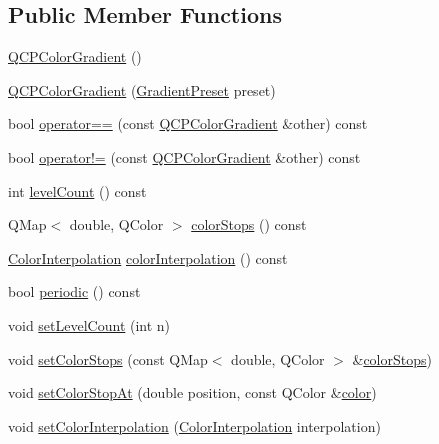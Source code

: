 \subsection*{Public Member Functions}
\begin{DoxyCompactItemize}
\item 
\hyperlink{class_q_c_p_color_gradient_a96bcc490ff9dc32b22941ce00800bce0}{Q\+C\+P\+Color\+Gradient} ()
\item 
\hyperlink{class_q_c_p_color_gradient_a4e570b4004fd60bd135e52d685ed2b66}{Q\+C\+P\+Color\+Gradient} (\hyperlink{class_q_c_p_color_gradient_aed6569828fee337023670272910c9072}{Gradient\+Preset} preset)
\item 
bool \hyperlink{class_q_c_p_color_gradient_a7f3478c33c59aa3c03b9ea1f809877fa}{operator==} (const \hyperlink{class_q_c_p_color_gradient}{Q\+C\+P\+Color\+Gradient} \&other) const
\item 
bool \hyperlink{class_q_c_p_color_gradient_ad26a10e3beaef4fc6f2553d1a9756087}{operator!=} (const \hyperlink{class_q_c_p_color_gradient}{Q\+C\+P\+Color\+Gradient} \&other) const
\item 
int \hyperlink{class_q_c_p_color_gradient_ac4b9d7034fc3b6c76318b05075367090}{level\+Count} () const
\item 
Q\+Map$<$ double, Q\+Color $>$ \hyperlink{class_q_c_p_color_gradient_aaab19729e921682401044ac8e518ff02}{color\+Stops} () const
\item 
\hyperlink{class_q_c_p_color_gradient_ac5dca17cc24336e6ca176610e7f77fc1}{Color\+Interpolation} \hyperlink{class_q_c_p_color_gradient_abad5002858db8cf75ecb045200881de6}{color\+Interpolation} () const
\item 
bool \hyperlink{class_q_c_p_color_gradient_a22a1d2b17f203caf0dcec833507fb9e0}{periodic} () const
\item 
void \hyperlink{class_q_c_p_color_gradient_a18da587eb4f7fc788ea28ba15b6a12de}{set\+Level\+Count} (int n)
\item 
void \hyperlink{class_q_c_p_color_gradient_a724e828aa6f0ba5011a9392477c35d3a}{set\+Color\+Stops} (const Q\+Map$<$ double, Q\+Color $>$ \&\hyperlink{class_q_c_p_color_gradient_aaab19729e921682401044ac8e518ff02}{color\+Stops})
\item 
void \hyperlink{class_q_c_p_color_gradient_a3b48be5e78079db1bb2a1188a4c3390e}{set\+Color\+Stop\+At} (double position, const Q\+Color \&\hyperlink{class_q_c_p_color_gradient_a0599545c859268b025d2060dea741cea}{color})
\item 
void \hyperlink{class_q_c_p_color_gradient_aa13fda86406e1d896a465a409ae63b38}{set\+Color\+Interpolation} (\hyperlink{class_q_c_p_color_gradient_ac5dca17cc24336e6ca176610e7f77fc1}{Color\+Interpolation} interpolation)

\end{DoxyCompactItemize}
